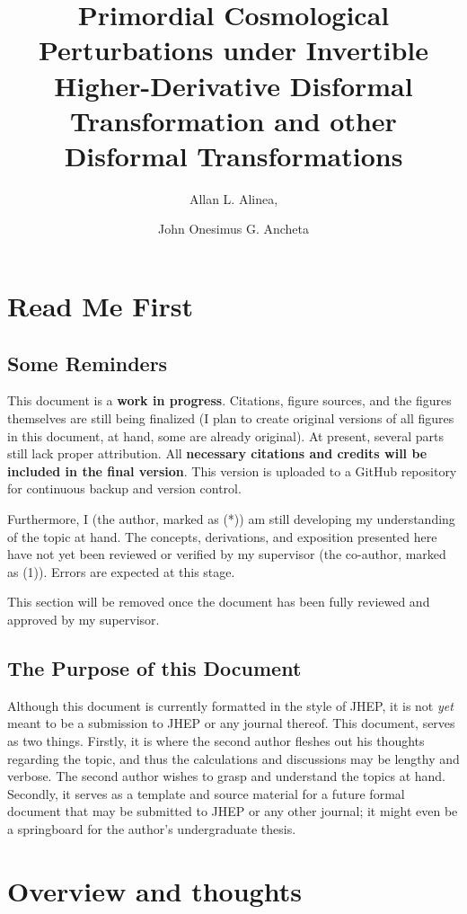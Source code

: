 \documentclass[a4paper,11pt]{article}
\title{\boldmath Primordial Cosmological Perturbations under Invertible Higher-Derivative Disformal Transformation and other Disformal Transformations}
\author[1]{Allan L. Alinea,\note{Corresponding author.}}
\author[*]{John Onesimus G. Ancheta \note[*]{The guy writing this document}}
\affiliation[]{Astrophysics, Particle Physics, Nuclear Physics Research Cluster
\\Institute of Physics, \\ University of the Philippines Los Baños \\ 4031 College, Los Baños, Laguna, Philippines}
\begin{document}
 
\maketitle
\flushbottom


\section{Read Me First}
\subsection*{Some Reminders}
This document is a \textbf{work in progress}. Citations, figure sources, and the figures themselves are still being finalized
 (I plan to create original versions of all figures in this document, at hand, some are already original). At present, several parts still lack proper attribution. All \textbf{necessary citations and credits will be included in the final version}. This version is uploaded to a GitHub repository for continuous backup and version control.

Furthermore, I (the author, marked as (*)) am still developing my understanding of the topic at hand. The concepts, derivations, and exposition presented here have not yet been reviewed or verified by my supervisor (the co-author, marked as (1)). Errors are expected at this stage.

This section will be removed once the document has been fully reviewed and approved by my supervisor.
\subsection*{The Purpose of this Document}
Although this document is currently formatted in the style of JHEP, it is not \textit{yet} meant
to be a submission to JHEP or any journal thereof. This document, serves as two things. Firstly, it is where the second author
fleshes out his thoughts regarding the topic, and thus the calculations and discussions may be lengthy and verbose.
The second author wishes to grasp and understand the topics at hand. Secondly, it serves as a template and source material
for a future formal document that may be submitted to JHEP or any other journal; it might even be a springboard for the author's undergraduate thesis. 



\section{Overview and thoughts}
\end{document}
